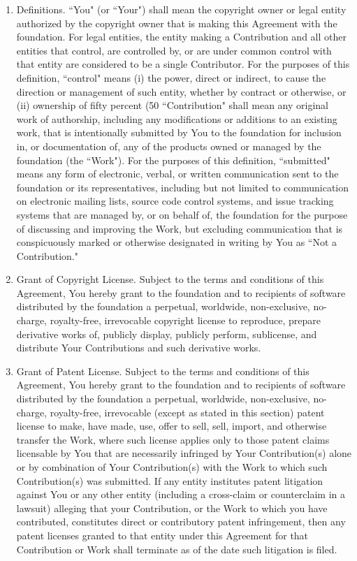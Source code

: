 \documentclass[a4paper]{article}
\begin{document}
\begin{enumerate}
\item Definitions.
``You" (or ``Your") shall mean the copyright owner or legal entity authorized by the copyright owner that is making this Agreement with the foundation. For legal entities, the entity making a Contribution and all other entities that control, are controlled by, or are under common control with that entity are considered to be a single Contributor. For the purposes of this definition, ``control" means (i) the power, direct or indirect, to cause the direction or management of such entity, whether by contract or otherwise, or (ii) ownership of fifty percent (50%
``Contribution" shall mean any original work of authorship, including any modifications or additions to an existing work, that is intentionally submitted by You to the foundation for inclusion in, or documentation of, any of the products owned or managed by the foundation (the ``Work"). For the purposes of this definition, ``submitted" means any form of electronic, verbal, or written communication sent to the foundation or its representatives, including but not limited to communication on electronic mailing lists, source code control systems, and issue tracking systems that are managed by, or on behalf of, the foundation for the purpose of discussing and improving the Work, but excluding communication that is conspicuously marked or otherwise designated in writing by You as ``Not a Contribution."
\item Grant of Copyright License. Subject to the terms and conditions of this Agreement, You hereby grant to the foundation and to recipients of software distributed by the foundation a perpetual, worldwide, non-exclusive, no-charge, royalty-free, irrevocable copyright license to reproduce, prepare derivative works of, publicly display, publicly perform, sublicense, and distribute Your Contributions and such derivative works.
\item Grant of Patent License. Subject to the terms and conditions of this Agreement, You hereby grant to the foundation and to recipients of software distributed by the foundation a perpetual, worldwide, non-exclusive, no-charge, royalty-free, irrevocable (except as stated in this section) patent license to make, have made, use, offer to sell, sell, import, and otherwise transfer the Work, where such license applies only to those patent claims licensable by You that are necessarily infringed by Your Contribution(s) alone or by combination of Your Contribution(s) with the Work to which such Contribution(s) was submitted. If any entity institutes patent litigation against You or any other entity (including a cross-claim or counterclaim in a lawsuit) alleging that your Contribution, or the Work to which you have contributed, constitutes direct or contributory patent infringement, then any patent licenses granted to that entity under this Agreement for that Contribution or Work shall terminate as of the date such litigation is filed.

\end{enumerate}
\end{document}
